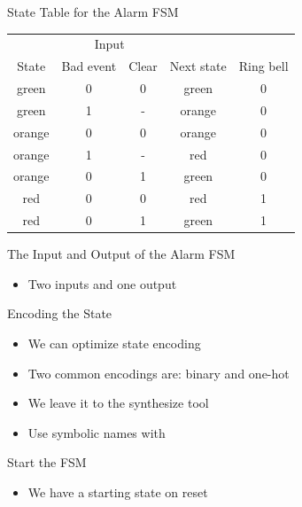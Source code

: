\begin{frame}[fragile]{State Table for the Alarm FSM}
\begin{table}
\centering
\begin{tabular}{ccccc}
\toprule
& \multicolumn{2}{c}{Input} \\
\cmidrule{2-3}
State &  Bad event & Clear & Next state & Ring bell \\
\midrule
green & 0 & 0 & green & 0 \\
green & 1 & - & orange & 0 \\
orange & 0 & 0 & orange & 0 \\
orange & 1 & - & red & 0 \\
orange & 0 & 1 & green & 0 \\
red & 0 & 0 & red & 1 \\
red & 0 & 1 & green & 1 \\
\bottomrule
\end{tabular}
\label{tab:state:table}
\end{table}
\end{frame}

\begin{frame}[fragile]{The Input and Output of the Alarm FSM}
\begin{itemize}
\item Two inputs and one output
\end{itemize}
\end{frame}

\begin{frame}[fragile]{Encoding the State}
\begin{itemize}
\item We can optimize state encoding
\item Two common encodings are: binary and one-hot
\item We leave it to the synthesize tool
\item Use symbolic names with 
\end{itemize}
\end{frame}

\begin{frame}[fragile]{Start the FSM}
\begin{itemize}
\item We have a starting state on reset
\end{itemize}
\end{frame}


